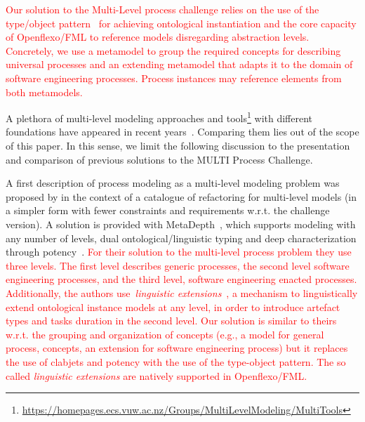 

\textcolor{red}{Our solution to the Multi-Level process challenge relies on the use of the type/object pattern~\citep{typeObject} for achieving ontological instantiation and the core capacity of Openflexo/FML to reference models disregarding abstraction levels. Concretely, we use a metamodel to group the required concepts for describing universal processes and an extending metamodel that adapts it to the domain of software engineering processes. Process instances may reference elements from both metamodels.}

A plethora of multi-level modeling approaches and tools\footnote{\url{https://homepages.ecs.vuw.ac.nz/Groups/MultiLevelModeling/MultiTools}} with different foundations have appeared in recent years~\citep{somogyi2021playground}. Comparing them lies out of the scope of this paper. In this sense, we limit the following discussion to the presentation and comparison of previous solutions to the MULTI Process Challenge.

A first description of process modeling as a multi-level modeling problem was proposed by \parencite{lara2018refactoring} in the context of a catalogue of refactoring for multi-level models (in a simpler form with fewer constraints and requirements w.r.t. the challenge version). A solution is provided with MetaDepth~\parencite{metadepth}, which supports modeling with any number of levels, dual ontological/linguistic typing and deep characterization through potency~\citep{potency}. \textcolor{red}{For their solution to the multi-level process problem they use three levels. The first level describes generic processes, the second level software engineering processes, and the third level, software engineering enacted processes. Additionally, the authors use~\emph{linguistic extensions}~\citep{metadepth}, a mechanism to  linguistically extend ontological instance models at any level, in order to introduce artefact types and tasks duration in the second level. Our solution is similar to theirs w.r.t. the grouping and organization of concepts (e.g., a model for general process, concepts, an extension for software engineering process) but it replaces the use of clabjets and potency with the use of the type-object pattern. The so called \emph{linguistic extensions} are natively supported in Openflexo/FML.}

